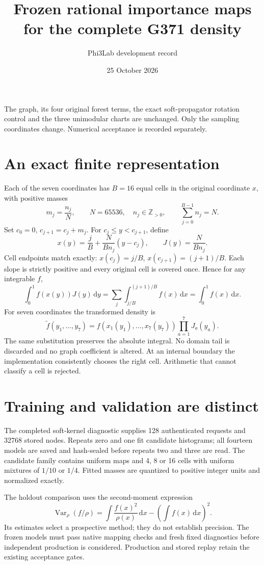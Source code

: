 \documentclass[11pt]{article}
\title{Frozen rational importance maps for the complete G371 density}
\author{Phi3Lab development record}
\date{25 October 2026}
\begin{document}
\maketitle
\noindent The graph, its four original forest terms, the exact soft-propagator
rotation control and the three unimodular charts are unchanged. Only the
sampling coordinates change. Numerical acceptance is recorded separately.

\section*{An exact finite representation}
Each of the seven coordinates has \(B=16\) equal cells in the original
coordinate \(x\), with positive masses
\[
 m_j=\frac{n_j}{N},\qquad N=65536,\quad n_j\in\mathbb Z_{>0},
 \qquad \sum_{j=0}^{B-1}n_j=N.
\]
Set \(c_0=0\), \(c_{j+1}=c_j+m_j\).
For \(c_j\le y<c_{j+1}\), define
\[
 x(y)=\frac jB+\frac{N}{Bn_j}(y-c_j),
 \qquad J(y)=\frac{N}{Bn_j}.
\]
Cell endpoints match exactly:
\(x(c_j)=j/B\), \(x(c_{j+1})=(j+1)/B\).
Each slope is strictly positive and every original cell is covered once.
Hence for any integrable \(f\),
\[
 \int_0^1 f(x(y))J(y)\,\mathrm dy
 =\sum_j\int_{j/B}^{(j+1)/B}f(x)\,\mathrm dx
 =\int_0^1 f(x)\,\mathrm dx.
\]
For seven coordinates the transformed density is
\[
 \widetilde f(y_1,\ldots,y_7)
 =f(x_1(y_1),\ldots,x_7(y_7))\prod_{a=1}^7J_a(y_a).
\]
The same substitution preserves the absolute integral. No domain tail is
discarded and no graph coefficient is altered. At an internal boundary the
implementation consistently chooses the right cell. Arithmetic that cannot
classify a cell is rejected.

\section*{Training and validation are distinct}
The completed soft-kernel diagnostic supplies 128 authenticated requests
and 32768 stored nodes. Repeats zero and one fit candidate histograms;
all fourteen models are saved and hash-sealed before repeats two and three
are read. The candidate family contains uniform maps and 4, 8 or 16 cells
with uniform mixtures of \(1/10\) or \(1/4\).
Fitted masses are quantized to positive integer units and normalized exactly.

The holdout comparison uses the second-moment expression
\[
 \operatorname{Var}_{\rho}(f/\rho)
 =\int\frac{f(x)^2}{\rho(x)}\,\mathrm dx
     -\left(\int f(x)\,\mathrm dx\right)^2.
\]
Its estimates select a prospective method; they do not establish precision.
The frozen models must pass native mapping checks and fresh fixed diagnostics
before independent production is considered. Production and stored replay
retain the existing acceptance gates.
\end{document}
